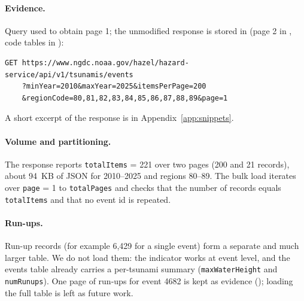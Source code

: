 \documentclass[a4paper,11pt,oneside]{book}
\begin{document}
\paragraph{Evidence.}
Query used to obtain page 1; the unmodified response is stored in  (page 2 in , code tables in ):
\begin{lstlisting}
GET https://www.ngdc.noaa.gov/hazel/hazard-service/api/v1/tsunamis/events
    ?minYear=2010&maxYear=2025&itemsPerPage=200
    &regionCode=80,81,82,83,84,85,86,87,88,89&page=1
\end{lstlisting}
A short excerpt of the response is in Appendix~\ref{app:snippets}.

\paragraph{Volume and partitioning.}
The response reports \texttt{totalItems} = 221 over two pages (200 and 21 records), about 94~KB of JSON for 2010--2025 and regions 80--89.
The bulk load iterates over \texttt{page} = 1 to \texttt{totalPages} and checks that the number of records equals \texttt{totalItems} and that no event id is repeated.

\paragraph{Run-ups.}
Run-up records (for example 6,429 for a single event) form a separate and much larger table.
We do not load them: the indicator works at event level, and the events table already carries a per-tsunami summary (\texttt{maxWaterHeight} and \texttt{numRunups}).
One page of run-ups for event 4682 is kept as evidence (); loading the full table is left as future work.
\end{document}
